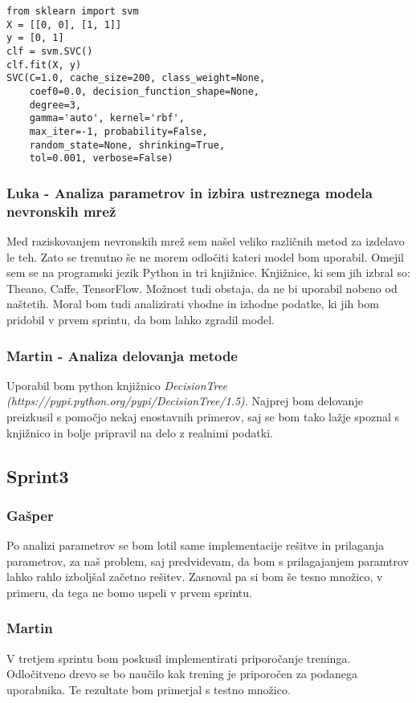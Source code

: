\documentclass[a4paper,11pt]{article}
\begin{document}
\begin{lstlisting}[caption={Uporaba SVM v Pythonu},captionpos=b]
from sklearn import svm
X = [[0, 0], [1, 1]]
y = [0, 1]
clf = svm.SVC()
clf.fit(X, y)  
SVC(C=1.0, cache_size=200, class_weight=None, 
	coef0=0.0, decision_function_shape=None, 
	degree=3,
    gamma='auto', kernel='rbf',
    max_iter=-1, probability=False, 
    random_state=None, shrinking=True,
    tol=0.001, verbose=False)
\end{lstlisting}


\subsubsection{Luka - Analiza parametrov in izbira ustreznega modela nevronskih mrež}
Med raziskovanjem nevronskih mrež sem našel veliko različnih metod za izdelavo le teh. Zato se trenutno še ne morem odločiti kateri model bom uporabil. Omejil sem se na programski jezik Python in tri knjižnice. Knjižnice, ki sem jih izbral so: Theano, Caffe, TensorFlow. Možnost tudi obstaja, da ne bi uporabil nobeno od naštetih. Moral bom tudi analizirati vhodne in izhodne podatke, ki jih bom pridobil v prvem sprintu, da bom lahko zgradil model.

\subsubsection{Martin - Analiza delovanja metode}
Uporabil bom python knjižnico \textit{DecisionTree (https://pypi.python.org/pypi/DecisionTree/1.5)}. Najprej bom delovanje preizkusil s pomočjo nekaj enostavnih primerov, saj se bom tako lažje spoznal s knjižnico in bolje pripravil na delo z realnimi podatki.


\subsection{Sprint3}
\subsubsection{Gašper}
Po analizi parametrov se bom lotil same implementacije rešitve in prilaganja parametrov, za naš problem, saj predvidevam, da bom s prilagajanjem paramtrov lahko rahlo izboljšal začetno rešitev. Zasnoval pa si bom še tesno množico, v primeru, da tega ne bomo uspeli v prvem sprintu.
\subsubsection{Martin}
V tretjem sprintu bom poskusil implementirati priporočanje treninga. Odločitveno drevo se bo naučilo kak trening je priporočen za podanega uporabnika. Te rezultate bom primerjal s testno množico. 
\end{document}
